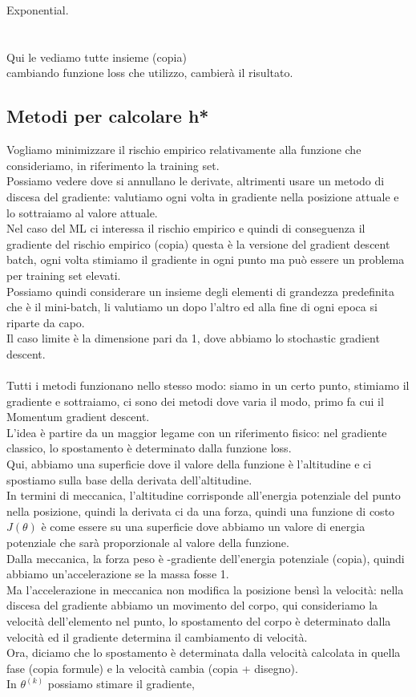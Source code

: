 \documentclass[12pt, oneside]{extbook}
\begin{document}
Exponential.\\\\\\Qui le vediamo tutte insieme (copia)\\cambiando funzione loss che utilizzo, cambierà il risultato.

\subsection{Metodi per calcolare h*}
Vogliamo minimizzare il rischio empirico relativamente alla funzione che consideriamo, in riferimento la training set.\\Possiamo vedere dove si annullano le derivate, altrimenti usare un metodo di discesa del gradiente: valutiamo ogni volta in gradiente nella posizione attuale e lo sottraiamo al valore attuale.\\Nel caso del ML ci interessa il rischio empirico e quindi di conseguenza il gradiente del rischio empirico (copia) questa è la versione del gradient descent batch, ogni volta stimiamo il gradiente in ogni punto ma può essere un problema per training set elevati.\\Possiamo quindi considerare un insieme degli elementi di grandezza predefinita che è il mini-batch, li valutiamo un dopo l'altro ed alla fine di ogni epoca si riparte da capo.\\Il caso limite è la dimensione pari da 1, dove abbiamo lo stochastic gradient descent.\\\\Tutti i metodi funzionano nello stesso modo: siamo in un certo punto, stimiamo il gradiente e sottraiamo, ci sono dei metodi dove varia il modo, primo fa cui il Momentum gradient descent.\\L'idea è partire da un maggior legame con un riferimento fisico: nel gradiente classico, lo spostamento è determinato dalla funzione loss.\\Qui, abbiamo una superficie dove il valore della funzione è l'altitudine e ci spostiamo sulla base della derivata dell'altitudine.\\In termini di meccanica, l'altitudine corrisponde all'energia potenziale del punto nella posizione, quindi la derivata ci da una forza, quindi una funzione di costo $J(\theta)$ è come essere su una superficie dove abbiamo un valore di energia potenziale che sarà proporzionale al valore della funzione.\\Dalla meccanica, la forza peso è -gradiente dell'energia potenziale (copia), quindi abbiamo un'accelerazione se la massa fosse 1.\\Ma l'accelerazione in meccanica non modifica la posizione bensì la velocità: nella discesa del gradiente abbiamo un movimento del corpo, qui consideriamo la velocità dell'elemento nel punto, lo spostamento del corpo è determinato dalla velocità ed il gradiente determina il cambiamento di velocità.\\Ora, diciamo che lo spostamento è determinata dalla velocità calcolata in quella fase (copia formule) e la velocità cambia (copia + disegno).\\In $\theta^{(k)}$ possiamo stimare il gradiente, 
\end{document}

